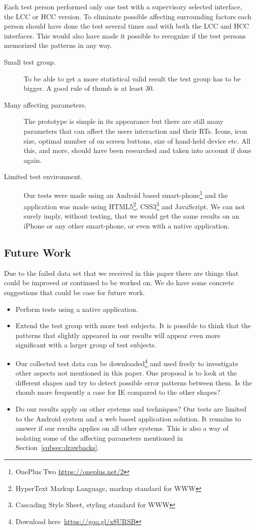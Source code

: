 \documentclass[runningheads,a4paper]{llncs}
\begin{document}
Each test person performed only one test with a supervisory selected interface, the LCC or HCC version. To eliminate possible affecting surrounding factors each person should have done the test several times and with both the LCC and HCC interfaces. This would also have made it possible to recognize if the test persons memorized the patterns in any way.

\begin{description}
	\item[Small test group.] To be able to get a more statistical valid result the test group has to be bigger. A good rule of thumb is at least 30.
	\item[Many affecting parameters.] The prototype is simple in its appearance but there are still many parameters that can affect the users interaction and their RTs. Icons, icon size, optimal number of on screen buttons, size of hand-held device etc. All this, and more, should have been researched and taken into account if done again. 
	\item[Limited test environment.] Our tests were made using an Android based smart-phone\footnote{OnePlus Two \url{https://oneplus.net/2}} and the application was made using HTML5\footnote{HyperText Markup Language, markup standard for WWW}, CSS3\footnote{Cascading Style Sheet, styling standard for WWW} and JavaScript. We can not surely imply, without testing, that we would get the same results on an iPhone or any other smart-phone, or even with a native application.
\end{description}

\subsection{Future Work}
Due to the failed data set that we received in this paper there are things that could be improved or continued to be worked on. 
We do have some concrete suggestions that could be case for future work. 

\begin{itemize}
	\item Perform tests using a native application.
	\item Extend the test group with more test subjects. It is possible to think that the patterns that slightly appeared in our results will appear even more significant with a larger group of test subjects.
	\item Our collected test data can be downloaded\footnote{Download here~\url{https://goo.gl/x8URSB}} and used freely to investigate other aspects not mentioned in this paper. One proposal is to look at the different shapes and try to detect possible error patterns between them. Is the rhomb more frequently a case for IE compared to the other shapes?
	\item Do our results apply on other systems and techniques? Our tests are limited to the Android system and a web based application solution. It remains to answer if our results applies on all other systems. This is also a way of isolating some of the affecting parameters mentioned in Section~\ref{subsec:drawbacks}.
\end{itemize}
\end{document}
